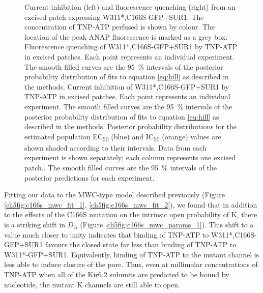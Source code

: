 \begin{figure}[h]
	\caption[C166S alters sensitivity to nucleotide inhibition]{
	 Current inhibition (left) and fluorescence quenching (right) from an excised patch expressing W311*,C166S-GFP+SUR1.
	The concentration of TNP-ATP perfused is shown by colour.
	The location of the peak ANAP fluorescence is marked as a grey box.
	 Fluorescence quenching of W311*,C166S-GFP+SUR1 by TNP-ATP in excised patches.
	Each point represents an individual experiment.
	The smooth filled curves are the \SI{95}{\percent} intervals of the posterior probability distribution of fits to equation \ref{eq:hill} as described in the methods.
	 Current inhibition of W311*,C166S-GFP+SUR1 by TNP-ATP in excised patches.
	Each point represents an individual experiment.
	The smooth filled curves are the \SI{95}{\percent} intervals of the posterior probability distribution of fits to equation \ref{eq:hill} as described in the methods.
	 Posterior probability distributions for the estimated population EC\textsubscript{50} (blue) and IC\textsubscript{50} (orange) values are shown shaded according to their intervals.
	 Data from each experiment is shown separately; each column represents one excised patch..
	The smooth filled curves are the \SI{95}{\percent} intervals of the posterior predictions for each experiment.
	}\label{ch5fig:c166s_2}
\end{figure}

Fitting our data to the MWC-type model described previously (Figure \ref{ch5fig:c166s_mwc_fit_1}, \ref{ch5fig:c166s_mwc_fit_2}), we found that in addition to the effects of the C166S mutation on the intrinsic open probability of K\ATP{}, there is a striking shift in $D_A$ (Figure \ref{ch5fig:c166s_mwc_params_1}).
This shift to a value much closer to unity indicates that binding of TNP-ATP to W311*,C166S-GFP+SUR1 favours the closed state far less than binding of TNP-ATP to W311*-GFP+SUR1.
Equivalently, binding of TNP-ATP to the mutant channel is less able to induce closure of the pore.
Thus, even at millimolar concentrations of TNP-ATP when all of the Kir6.2 subunits are predicted to be bound by nucleotide, the mutant K\ATP{} channels are still able to open.

